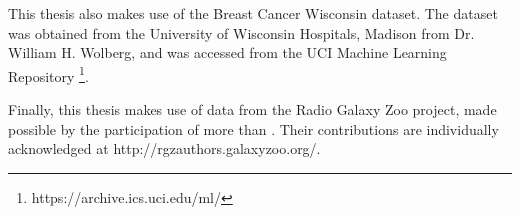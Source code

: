   This thesis also makes use of the Breast Cancer Wisconsin dataset. The dataset
  was obtained from the University of Wisconsin Hospitals, Madison from Dr.
  William H. Wolberg, and was accessed from the UCI Machine Learning Repository
  \footnote{https://archive.ics.uci.edu/ml/}.

  Finally, this thesis makes use of data from the Radio Galaxy Zoo project, made
  possible by the participation of more than . Their
  contributions are individually acknowledged at
  http://rgzauthors.galaxyzoo.org/.
